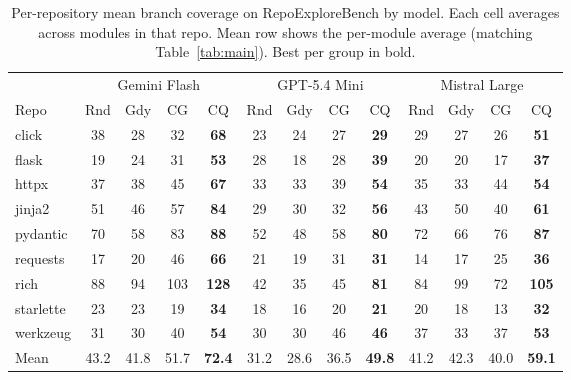 \begin{table}[t]
\centering
\caption{Per-repository mean branch coverage on RepoExploreBench by model. Each cell averages across modules in that repo. Mean row shows the per-module average (matching Table~\ref{tab:main}). Best per group in bold.}
\label{tab:perrepo_repoexplorebench}
\small
\setlength{\tabcolsep}{3pt}
\begin{tabular}{l cccc cccc cccc}
\toprule
& \multicolumn{4}{c}{Gemini Flash}& \multicolumn{4}{c}{GPT-5.4 Mini}& \multicolumn{4}{c}{Mistral Large} \\
\cmidrule(lr){2-5} \cmidrule(lr){6-9} \cmidrule(lr){10-13}
Repo & Rnd & Gdy & CG & CQ & Rnd & Gdy & CG & CQ & Rnd & Gdy & CG & CQ \\
\midrule
click & 38 & 28 & 32 & \textbf{68} & 23 & 24 & 27 & \textbf{29} & 29 & 27 & 26 & \textbf{51} \\
flask & 19 & 24 & 31 & \textbf{53} & 28 & 18 & 28 & \textbf{39} & 20 & 20 & 17 & \textbf{37} \\
httpx & 37 & 38 & 45 & \textbf{67} & 33 & 33 & 39 & \textbf{54} & 35 & 33 & 44 & \textbf{54} \\
jinja2 & 51 & 46 & 57 & \textbf{84} & 29 & 30 & 32 & \textbf{56} & 43 & 50 & 40 & \textbf{61} \\
pydantic & 70 & 58 & 83 & \textbf{88} & 52 & 48 & 58 & \textbf{80} & 72 & 66 & 76 & \textbf{87} \\
requests & 17 & 20 & 46 & \textbf{66} & 21 & 19 & 31 & \textbf{31} & 14 & 17 & 25 & \textbf{36} \\
rich & 88 & 94 & 103 & \textbf{128} & 42 & 35 & 45 & \textbf{81} & 84 & 99 & 72 & \textbf{105} \\
starlette & 23 & 23 & 19 & \textbf{34} & 18 & 16 & 20 & \textbf{21} & 20 & 18 & 13 & \textbf{32} \\
werkzeug & 31 & 30 & 40 & \textbf{54} & 30 & 30 & 46 & \textbf{46} & 37 & 33 & 37 & \textbf{53} \\
\midrule
Mean & 43.2 & 41.8 & 51.7 & \textbf{72.4} & 31.2 & 28.6 & 36.5 & \textbf{49.8} & 41.2 & 42.3 & 40.0 & \textbf{59.1} \\
\bottomrule
\end{tabular}
\end{table}
